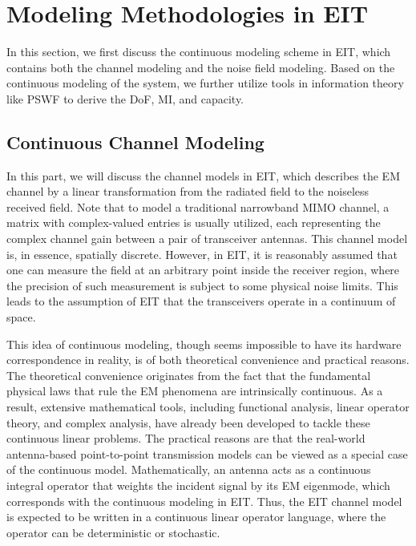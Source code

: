 \documentclass[journal,twocolumn]{IEEEtran}
\begin{document}
\section{Modeling Methodologies in EIT}
In this section, we first discuss the continuous modeling scheme in EIT, which contains both the channel modeling and the noise field modeling. 
Based on the continuous modeling of the system, we further utilize tools in information theory like PSWF to derive the DoF, MI, and capacity.

\subsection{Continuous Channel Modeling}
In this part, we will discuss the channel models in EIT, which describes the EM channel by a linear transformation from the radiated field to the noiseless received field.  
Note that to model a traditional narrowband MIMO channel, a matrix with complex-valued entries is usually utilized, each representing the complex channel gain between a pair of transceiver antennas. 
This channel model is, in essence, spatially discrete. 
However, in EIT, it is reasonably assumed that one can measure the field at an arbitrary point inside the receiver region, where the precision of such measurement is subject to some physical noise limits. This leads to the assumption of EIT that the transceivers operate in a continuum of space.  

This idea of continuous modeling, though seems impossible to have its hardware correspondence in reality, is of both theoretical convenience and practical reasons. 
The theoretical convenience originates from the fact that the fundamental physical laws that rule the EM phenomena are intrinsically continuous. 
As a result, extensive mathematical tools, including functional analysis, linear operator theory, and complex analysis, have already been developed to tackle these continuous linear problems. 
The practical reasons are that the real-world antenna-based point-to-point transmission models can be viewed as a special case of the continuous model. 
Mathematically, an antenna acts as a continuous integral operator that weights the incident signal by its EM eigenmode, which corresponds with the continuous modeling in EIT. 
Thus, the EIT channel model is expected to be written in a continuous linear operator language, where the operator can be deterministic or stochastic.
\end{document}
